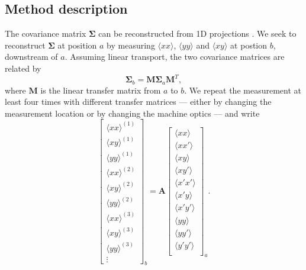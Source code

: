 \subsection{Method description}

The covariance matrix $\bm{\Sigma}$ can be reconstructed from 1D projections \cite{book:Minty2003, Woodley2000, Prat2014}. We seek to reconstruct $\bm{\Sigma}$ at position $a$ by measuring $\langle{xx}\rangle$, $\langle{yy}\rangle$ and $\langle{xy}\rangle$ at postion $b$, downstream of $a$. Assuming linear transport, the two covariance matrices are related by
%
\begin{equation}
    \bm{\Sigma}_b = \mathbf{M} \bm{\Sigma}_a \mathbf{M}^T,
\end{equation}
%
where $\mathbf{M}$ is the linear transfer matrix from $a$ to $b$. We repeat the measurement at least four times with different transfer matrices — either by changing the measurement location or by changing the machine optics — and write
%
\begin{equation}
    \begin{bmatrix}
        {\langle{xx}\rangle}^{(1)} \\
        {\langle{xy}\rangle}^{(1)} \\
        {\langle{yy}\rangle}^{(1)} \\
        {\langle{xx}\rangle}^{(2)} \\
        {\langle{xy}\rangle}^{(2)} \\
        {\langle{yy}\rangle}^{(2)} \\
        {\langle{xx}\rangle}^{(3)} \\
        {\langle{xy}\rangle}^{(3)} \\
        {\langle{yy}\rangle}^{(3)} \\
        \vdots
    \end{bmatrix}_b
    = \mathbf{A}
    \begin{bmatrix}
        \langle{xx}\rangle \\
        \langle{xx'}\rangle \\
        \langle{xy}\rangle \\
        \langle{xy'}\rangle \\
        \langle{x'x'}\rangle \\
        \langle{x'y}\rangle \\
        \langle{x'y'}\rangle \\
        \langle{yy}\rangle \\
        \langle{yy'}\rangle \\
        \langle{y'y'}\rangle \\
    \end{bmatrix}_a
    .
\end{equation}
